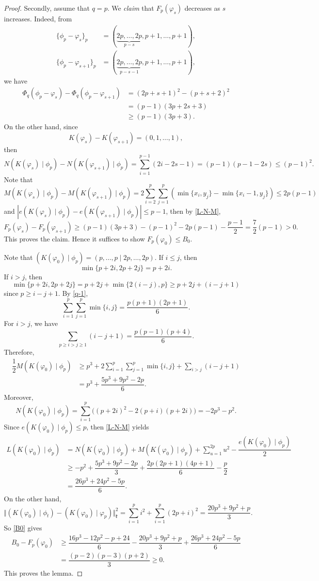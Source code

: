 \documentclass[11pt]{amsart}
\theoremstyle{plain}
\theoremstyle{definition}
\newcommand{\frk}{\mathfrak{k}}
\begin{document}
\begin{proof}
	
Secondly, assume that $q=p$. We \emph{claim} that $F_p(\varphi_s)$ decreases as $s$ increases. Indeed, from
	\begin{align*}
	\{\phi_p-\varphi_{s}\}_p&=(\underbrace{2p,\dots,2p}_{p-s},p+1,\dots,p+1),\\
		\{\phi_p-\varphi_{s+1}\}_p&=(\underbrace{2p,\dots,2p}_{p-s-1},p+1,\dots,p+1),
	\end{align*}
	we have
	\begin{align*}
		\Phi_q(\phi_p-\varphi_{s})-\Phi_q(\phi_p-\varphi_{s+1})&=(2p+s+1)^2-(p+s+2)^2\\
		&=(p-1)(3p+2s+3)\\
		&\ge(p-1)(3p+3).
	\end{align*}
	On the other hand, since
	\[K(\varphi_s)-K(\varphi_{s+1})=(0,1,\dots,1),\]
	then
	\[N(K(\varphi_s)\mid\phi_p)-N(K(\varphi_{s+1})\mid\phi_p)=\sum_{i=1}^{p-1}(2i-2s-1)=(p-1)(p-1-2s)\le (p-1)^2.\]
	Note that
	\[M(K(\varphi_s)\mid\phi_p)-M(K(\varphi_{s+1})\mid\phi_p)=2\sum_{i=2}^p\sum_{j=1}^p(\min\{x_i,y_j\}-\min\{x_i-1,y_j\})\le 2p(p-1)\]
	and $|e(K(\varphi_s)\mid\phi_p)-e(K(\varphi_{s+1})\mid\phi_p)|\le p-1$, then by \eqref{L-N-M},
	\[F_p(\varphi_s)-F_p(\varphi_{s+1})\ge (p-1)(3p+3)-(p-1)^2-2p(p-1)-\dfrac{p-1}{2}=\dfrac{7}{2}(p-1)>0.\]
	This proves the claim. Hence it suffices to show $F_p(\varphi_0)\le B_0$.
	
	Note that $(K(\varphi_0)\mid \phi_p)=(p,\dots,p\mid 2p,\dots,2p)$. If $i\le j$, then
$$
\min\{p+2i,2p+2j\}=p+2i.
$$
If $i>j$, then
	\[\min\{p+2i,2p+2j\}=p+2j+\min\{2(i-j),p\}\ge p+2j+(i-j+1)\]
since $p\ge i-j+1$. 	 By \eqref{q-1},
	\[\sum_{i=1}^p\sum_{j=1}^p\min\{i,j\}=\dfrac{p(p+1)(2p+1)}{6}.\]
	For $i>j$, we have
	\[\sum_{p\ge i>j\ge 1}(i-j+1)=\dfrac{p(p-1)(p+4)}{6}.\]
	Therefore,
	\begin{align*}
		\dfrac{1}{2} M(K(\varphi_0)\mid \phi_p)&\ge p^3+2\sum_{i=1}^p\sum_{j=1}^p\min\{i,j\}+\sum_{i>j}(i-j+1)\\
		&=p^3+\dfrac{5p^3+9p^2-2p}{6}.
	\end{align*}
	Moreover,
	\[N(K(\varphi_0)\mid\phi_p)=\sum_{i=1}^p\big((p+2i)^2-2(p+i)(p+2i)\big)=-2p^3-p^2.\]
	Since $e(K(\varphi_0)\mid \phi_p)\le p$, then \eqref{L-N-M} yields
	\begin{align*}
		L(K(\varphi_0)\mid \phi_p)&= N(K(\varphi_0)\mid\phi_p)+M(K(\varphi_0)\mid\phi_p)+\sum_{u=1}^{2p}u^2-\dfrac{e(K(\varphi_0)\mid \phi_p)}{2}\\
		&\ge -p^2+\dfrac{5p^3+9p^2-2p}{3}+\dfrac{2p(2p+1)(4p+1)}{6}-\dfrac{p}{2}\\
		&=\dfrac{26p^3+24p^2-5p}{6}.
	\end{align*}
	On the other hand,
	\[\Vert(K(\varphi_0)\mid\phi_t)-(K(\varphi_0)\mid\varphi_p)\Vert_\frk^2=\sum_{i=1}^pi^2+\sum_{i=1}^p(2p+i)^2=\dfrac{20p^3+9p^2+p}{3}.\]
	So \eqref{B0} gives
	\begin{align*}
		B_0-F_p(\varphi_0)&\ge \dfrac{16p^3-12p^2-p+24}{6}-\dfrac{20p^3+9p^2+p}{3}+\dfrac{26p^3+24p^2-5p}{6}\\
		&=\dfrac{(p-2)(p-3)(p+2)}{3}\ge 0.
	\end{align*}
	This proves the lemma.
\end{proof}
\end{document}
